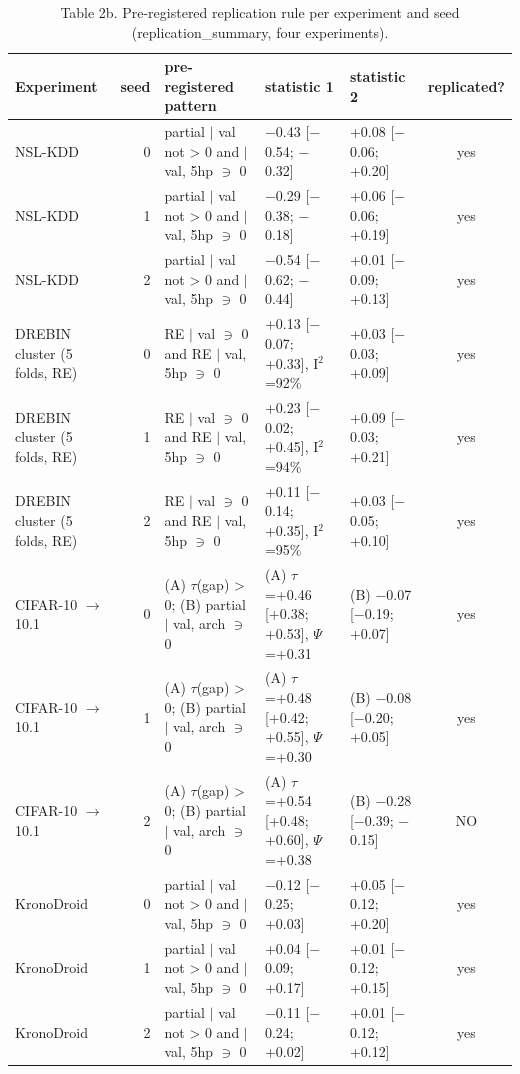 \begin{table}[t]
\centering\small
\caption{Table 2b. Pre-registered replication rule per experiment and seed (replication\_summary, four experiments).}
\label{tab:main_rule}
\begin{tabular}{lrlllc}
\toprule
Experiment & seed & pre-registered pattern & statistic 1 & statistic 2 & replicated? \\
\midrule
NSL-KDD & 0 & partial $\mid$ val not > 0 and $\mid$ val, 5hp $\ni$ 0 & $-$0.43 [$-$0.54; $-$0.32] & +0.08 [$-$0.06; +0.20] & yes \\
NSL-KDD & 1 & partial $\mid$ val not > 0 and $\mid$ val, 5hp $\ni$ 0 & $-$0.29 [$-$0.38; $-$0.18] & +0.06 [$-$0.06; +0.19] & yes \\
NSL-KDD & 2 & partial $\mid$ val not > 0 and $\mid$ val, 5hp $\ni$ 0 & $-$0.54 [$-$0.62; $-$0.44] & +0.01 [$-$0.09; +0.13] & yes \\
DREBIN cluster (5 folds, RE) & 0 & RE $\mid$ val $\ni$ 0 and RE $\mid$ val, 5hp $\ni$ 0 & +0.13 [$-$0.07; +0.33], I$^2$=92\% & +0.03 [$-$0.03; +0.09] & yes \\
DREBIN cluster (5 folds, RE) & 1 & RE $\mid$ val $\ni$ 0 and RE $\mid$ val, 5hp $\ni$ 0 & +0.23 [$-$0.02; +0.45], I$^2$=94\% & +0.09 [$-$0.03; +0.21] & yes \\
DREBIN cluster (5 folds, RE) & 2 & RE $\mid$ val $\ni$ 0 and RE $\mid$ val, 5hp $\ni$ 0 & +0.11 [$-$0.14; +0.35], I$^2$=95\% & +0.03 [$-$0.05; +0.10] & yes \\
CIFAR-10 $\rightarrow$ 10.1 & 0 & (A) $\tau$(gap) > 0; (B) partial $\mid$ val, arch $\ni$ 0 & (A) $\tau$=+0.46 [+0.38; +0.53], $\Psi$=+0.31 & (B) $-$0.07 [$-$0.19; +0.07] & yes \\
CIFAR-10 $\rightarrow$ 10.1 & 1 & (A) $\tau$(gap) > 0; (B) partial $\mid$ val, arch $\ni$ 0 & (A) $\tau$=+0.48 [+0.42; +0.55], $\Psi$=+0.30 & (B) $-$0.08 [$-$0.20; +0.05] & yes \\
CIFAR-10 $\rightarrow$ 10.1 & 2 & (A) $\tau$(gap) > 0; (B) partial $\mid$ val, arch $\ni$ 0 & (A) $\tau$=+0.54 [+0.48; +0.60], $\Psi$=+0.38 & (B) $-$0.28 [$-$0.39; $-$0.15] & NO \\
KronoDroid & 0 & partial $\mid$ val not > 0 and $\mid$ val, 5hp $\ni$ 0 & $-$0.12 [$-$0.25; +0.03] & +0.05 [$-$0.12; +0.20] & yes \\
KronoDroid & 1 & partial $\mid$ val not > 0 and $\mid$ val, 5hp $\ni$ 0 & +0.04 [$-$0.09; +0.17] & +0.01 [$-$0.12; +0.15] & yes \\
KronoDroid & 2 & partial $\mid$ val not > 0 and $\mid$ val, 5hp $\ni$ 0 & $-$0.11 [$-$0.24; +0.02] & +0.01 [$-$0.12; +0.12] & yes \\
\bottomrule
\end{tabular}
\end{table}
